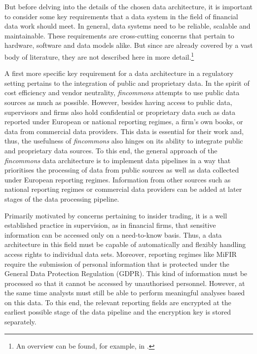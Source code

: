 \documentclass[a4paper, 11pt]{report}
\begin{document}
But before delving into the details of the chosen data architecture, it is important to consider some key requirements that a data system in the field of financial data work should meet. In general, data systems need to be reliable, scalable and maintainable. These requirements are cross-cutting concerns that pertain to hardware, software and data models alike. But since are already covered by a vast body of literature, they are not described here in more detail.\footnote{An overview can be found, for example, in \textcite[Chapter~1]{Kleppmann.2017}.}

A first more specific key requirement for a data architecture in a regulatory setting pertains to the integration of public and proprietary data. In the spirit of cost efficiency and vendor neutrality, \emph{fincommons} attempts to use public data sources as much as possible. However, besides having access to public data, supervisors and firms also hold confidential or proprietary data such as data reported under European or national reporting regimes, a firm's own books, or data from commercial data providers. This data is essential for their work and, thus, the usefulness of \emph{fincommons} also hinges on its ability to integrate public and proprietary data sources. To this end, the general approach of the \emph{fincommons} data architecture is to implement data pipelines in a way that prioritises the processing of data from public sources as well as data collected under European reporting regimes. Information from other sources such as national reporting regimes or commercial data providers can be added at later stages of the data processing pipeline.



Primarily motivated by concerns pertaining to insider trading, it is a well established practice in supervision, as in financial firms, that sensitive information can be accessed only on a need-to-know basis. Thus, a data architecture in this field must be capable of automatically and flexibly handling access rights to individual data sets. Moreover, reporting regimes like MiFIR require the submission of personal information that is protected under the General Data Protection Regulation (GDPR). This kind of information must be processed so that it cannot be accessed by unauthorised personnel. However, at the same time analysts must still be able to perform meaningful analyses based on this data. To this end, the relevant reporting fields are encrypted at the earliest possible stage of the data pipeline and the encryption key is stored separately.
\end{document}
